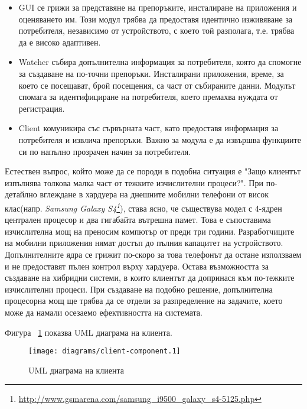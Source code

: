 \begin{itemize}
		\begin{itemize}
			\item GUI се грижи за представяне на препоръките, инсталиране на приложения и оценяването им. Този модул трябва да предоставя идентично изживяване за потребителя, независимо от устройството, с което той разполага, т.е. трябва да е високо адаптивен.
			\item Watcher събира допълнителна информация за потребителя, която да спомогне за създаване на по-точни препоръки. Инсталирани приложения, време, за което се посещават, брой посещения, са част от събираните данни. Модулът спомага за идентифициране на потребителя, което премахва нуждата от регистрация.
			\item Client комуникира със сървърната част, като предоставя информация за потребителя и извлича препоръки. Важно за модула е да извършва функциите си по напълно прозрачен начин за потребителя.

		\end{itemize}
		
		Естествен въпрос, който може да се породи в подобна ситуация е "Защо клиентът изпълнява толкова малка част от тежките изчислителни процеси?".
		При по-детайлно вглеждане в хардуера на днешните мобилни телефони от висок клас(напр. \emph{Samsung Galaxy S4\footnote{\url{http://www.gsmarena.com/samsung_i9500_galaxy_s4-5125.php}}}), става ясно, че съществува модел с 4-ядрен централен процесор и два гигабайта вътрешна памет. Това е съпоставима изчислителна мощ на преносим компютър от преди три години. Разработчиците на мобилни приложения нямат достъп до пълния капацитет на устройството. Допълнителните ядра се грижит по-скоро за това телефонът да остане използваем и не предоставят пълен контрол върху хардуера\cite{Gupta}.
		Остава възможността за създаване на хибридни системи, в които клиентът да допринася към по-тежките изчислителни процеси. При създаване на подобно решение, допълнителна процесорна мощ ще трябва да се отдели за разпределение на задачите, което може да намали осезаемо ефективността на системата.
		
		Фигура ~\ref{figure:client-component} показва UML диаграма на клиента.
		
		\begin{figure}[htbp]
			\centering	
 			\texttt{[image: diagrams/client-component.1]}
			\caption{UML диаграма на клиента}
			\label{figure:client-component}
		\end{figure}
	\end{itemize}
	
